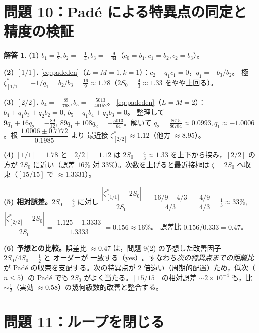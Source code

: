 \documentclass[dvipdfmx, uplatex]{jsarticle}
\theoremstyle{definition}
\newtheorem*{sol}{解答}
\begin{document}
\section{問題 10：Pad\'e による特異点の同定と精度の検証}

\begin{sol}
\textbf{(1)} $\boxed{b_1=\tfrac12,b_2=-\tfrac14,b_3=-\tfrac9{64}}$（$c_0=b_1,c_1=b_2,c_2=b_3$）。

\textbf{(2) $[1/1]$.} \eqref{eq:padeden}（$L=M=1,k=1$）：$c_2+q_1c_1=0$，$q_1=-b_3/b_2$。
極 $\zeta^\ast_{[1/1]}=-1/q_1=b_2/b_3=\boxed{\tfrac{16}{9}\approx1.78}$（$2S_0=\tfrac43\approx1.33$ をやや上回る）。

\textbf{(3) $[2/2]$.} $\boxed{b_4=-\tfrac{89}{768},b_5=-\tfrac{5013}{49152}}$。
\eqref{eq:padeden}（$L=M=2$）：$b_4+q_1b_3+q_2b_2=0,\ b_5+q_1b_4+q_2b_3=0$。
整理して $9q_1+16q_2=-\tfrac{89}{12},\ 89q_1+108q_2=-\tfrac{5013}{64}$。解いて
$q_2=\tfrac{8615}{86784}\approx0.0993,q_1\approx-1.0006$。根 $\dfrac{1.0006\pm0.7772}{0.1985}$ より
最近接 $\boxed{\zeta^\ast_{[2/2]}\approx1.12}$（他方 $\approx8.95$）。

\textbf{(4)} $[1/1]=1.78$ と $[2/2]=1.12$ は $2S_0=\tfrac43\approx1.33$ を上下から挟み，$\boxed{[2/2]}$ の方が
$2S_0$ に近い（誤差 $16\%$ 対 $33\%$）。次数を上げると最近接極は $\boxed{\zeta=2S_0}$ へ収束（$[15/15]$ で $\approx1.3331$）。

\textbf{(5) 相対誤差。}$2S_0=\tfrac43$ に対し
$\dfrac{|\zeta^\ast_{[1/1]}-2S_0|}{2S_0}=\dfrac{|16/9-4/3|}{4/3}=\dfrac{4/9}{4/3}=\boxed{\tfrac13\approx33\%}$,
$\dfrac{|\zeta^\ast_{[2/2]}-2S_0|}{2S_0}=\dfrac{|1.125-1.3333|}{1.3333}=\boxed{0.156\approx16\%}$。
誤差比 $0.156/0.333=\boxed{0.47}$。

\textbf{(6) 予想との比較。}誤差比 $\approx0.47$ は，問題 9(2) の予想した改善因子 $2S_0/4S_0=\tfrac12$ と
オーダーが $\boxed{\text{一致する（yes）}}$。すなわち\emph{次の特異点までの距離比}が Pad\'e の収束を支配する。次の特異点が
$2$ 倍遠い（周期的配置）ため，低次（$n\le5$）の Pad\'e でも $2S_0$ がよく当たる。$[15/15]$ の相対誤差
$\sim2\times10^{-4}$ も，比 $\sim\tfrac12$（実効 $\approx0.58$）の幾何級数的改善と整合する。
\end{sol}

\section{問題 11：ループを閉じる}
\end{document}
